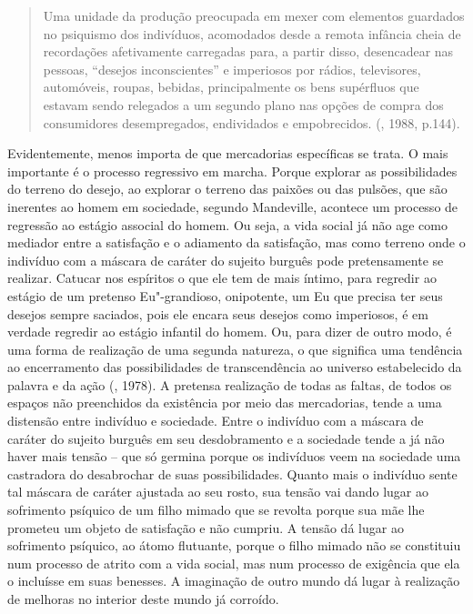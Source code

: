 {\begin{quote}
Uma unidade da produção preocupada em mexer com elementos guardados no
psiquismo dos indivíduos, acomodados desde a remota infância cheia de
recordações afetivamente carregadas para, a partir disso, desencadear
nas pessoas, ``desejos inconscientes'' e imperiosos por rádios,
televisores, automóveis, roupas, bebidas, principalmente os bens
supérfluos que estavam sendo relegados a um segundo plano nas opções de
compra dos consumidores desempregados, endividados e empobrecidos.
(, 1988, p.144).
\end{quote}

Evidentemente, menos importa de que mercadorias específicas se trata. O
mais importante é o processo regressivo em marcha. Porque explorar as
possibilidades do terreno do desejo, ao explorar o terreno das paixões
ou das pulsões, que são inerentes ao homem em sociedade, segundo
Mandeville, acontece um processo de regressão ao estágio associal do
homem. Ou seja, a vida social já não age como mediador entre a
satisfação e o adiamento da satisfação, mas como terreno onde o
indivíduo com a máscara de caráter do sujeito burguês pode pretensamente
se realizar. Catucar nos espíritos o que ele tem de mais íntimo, para
regredir ao estágio de um pretenso Eu"-grandioso, onipotente, um Eu que
precisa ter seus desejos sempre saciados, pois ele encara seus desejos
como imperiosos, é em verdade regredir ao estágio infantil do homem. Ou,
para dizer de outro modo, é uma forma de realização de uma segunda
natureza, o que significa uma tendência ao encerramento das
possibilidades de transcendência ao universo estabelecido da palavra e
da ação (, 1978). A pretensa realização de todas as faltas, de
todos os espaços não preenchidos da existência por meio das mercadorias,
tende a uma distensão entre indivíduo e sociedade. Entre o indivíduo com
a máscara de caráter do sujeito burguês em seu desdobramento e a
sociedade tende a já não haver mais tensão -- que só germina porque os
indivíduos veem na sociedade uma castradora do desabrochar de suas
possibilidades. Quanto mais o indivíduo sente tal máscara de caráter
ajustada ao seu rosto, sua tensão vai dando lugar ao sofrimento psíquico
de um filho mimado que se revolta porque sua mãe lhe prometeu um objeto
de satisfação e não cumpriu. A tensão dá lugar ao sofrimento psíquico,
ao átomo flutuante, porque o filho mimado não se constituiu num processo
de atrito com a vida social, mas num processo de exigência que ela o
incluísse em suas benesses. A imaginação de outro mundo dá lugar à
realização de melhoras no interior deste mundo já corroído.

}

